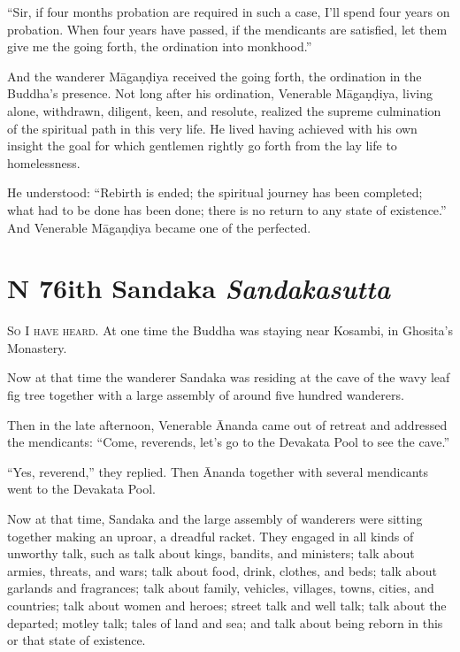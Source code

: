 \documentclass[12pt,openany]{book}%
\newcommand*{\suttatitleacronym}[1]{\smaller[2]{#1}\vspace*{.3em}}
\newcommand*{\suttatitletranslation}[1]{\linebreak{#1}}
\newcommand*{\suttatitleroot}[1]{\linebreak\smaller[2]\itshape{#1}}
\newcommand*{\tocacronym}[1]{\hspace*{-3.3em}{#1}\quad}
\newcommand*{\toctranslation}[1]{#1}
\newcommand*{\tocroot}[1]{(\textit{#1})}
\newcommand*{\scevam}[1]{\textsc{#1}}
\begin{document}
“Sir, if four months probation are required in such a case, I’ll spend four years on probation. When four years have passed, if the mendicants are satisfied, let them give me the going forth, the ordination into monkhood.” 

And the wanderer \textsanskrit{Māgaṇḍiya} received the going forth, the ordination in the Buddha’s presence. Not long after his ordination, Venerable \textsanskrit{Māgaṇḍiya}, living alone, withdrawn, diligent, keen, and resolute, realized the supreme culmination of the spiritual path in this very life. He lived having achieved with his own insight the goal for which gentlemen rightly go forth from the lay life to homelessness. 

He understood: “Rebirth is ended; the spiritual journey has been completed; what had to be done has been done; there is no return to any state of existence.” And Venerable \textsanskrit{Māgaṇḍiya} became one of the perfected. 

%
\section*{{\suttatitleacronym MN 76}{\suttatitletranslation With Sandaka }{\suttatitleroot Sandakasutta}}
\addcontentsline{toc}{section}{\tocacronym{MN 76} \toctranslation{With Sandaka } \tocroot{Sandakasutta}}

\scevam{So I have heard. }At one time the Buddha was staying near Kosambi, in Ghosita’s Monastery. 

Now at that time the wanderer Sandaka was residing at the cave of the wavy leaf fig tree together with a large assembly of around five hundred wanderers. 

Then in the late afternoon, Venerable Ānanda came out of retreat and addressed the mendicants: “Come, reverends, let’s go to the Devakata Pool to see the cave.” 

“Yes, reverend,” they replied. Then Ānanda together with several mendicants went to the Devakata Pool. 

Now at that time, Sandaka and the large assembly of wanderers were sitting together making an uproar, a dreadful racket. They engaged in all kinds of unworthy talk, such as talk about kings, bandits, and ministers; talk about armies, threats, and wars; talk about food, drink, clothes, and beds; talk about garlands and fragrances; talk about family, vehicles, villages, towns, cities, and countries; talk about women and heroes; street talk and well talk; talk about the departed; motley talk; tales of land and sea; and talk about being reborn in this or that state of existence. 
\end{document}
